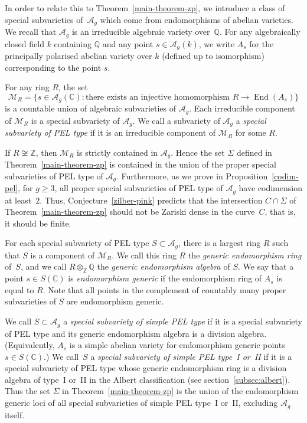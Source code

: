 \documentclass[11pt]{article}
\numberwithin{equation}{section}
\let\ra\rightarrow
\newcommand{\bC}{\mathbb{C}}
\newcommand{\bQ}{\mathbb{Q}}
\newcommand{\bZ}{\mathbb{Z}}
\newcommand{\cA}{\mathcal{A}}
\newcommand{\cM}{\mathcal{M}}
\newcommand{\Ag}{\mathcal{A}_g}
\DeclareMathOperator{\End}{End}
\newcommand{\defterm}[1]{\emph{#1}}
\begin{document}
In order to relate this to Theorem~\ref{main-theorem-zp}, we introduce a class of special subvarieties of~$\Ag$ which come from endomorphisms of abelian varieties.
We recall that $\cA_g$ is an irreducible algebraic variety over~$\bQ$.
For any algebraically closed field $k$ containing $\bQ$ and any point $s \in \Ag(k)$, we write $A_s$ for the principally polarised abelian variety over $k$ (defined up to isomorphism) corresponding to the point $s$.

For any ring $R$, the set
\[
\cM_R = \{ s \in \Ag(\bC) : \text{there exists an injective homomorphism } R \ra \End(A_s) \}
\]
is a countable union of algebraic subvarieties of $\Ag$.
Each irreducible component of $\cM_R$ is a special subvariety of $\Ag$.
We call a subvariety of $\Ag$ a \defterm{special subvariety of PEL type} if it is an irreducible component of $\cM_R$ for some $R$.

If $R \not\cong \bZ$, then $\cM_R$ is strictly contained in $\Ag$.
Hence the set $\Sigma$ defined in Theorem~\ref{main-theorem-zp} is contained in the union of the proper special subvarieties of PEL type of $\Ag$.
Furthermore, as we prove in Proposition~\ref{codim-pel}, for $g \geq 3$, all proper special subvarieties of PEL type of $\Ag$ have codimension at least~$2$.
Thus, Conjecture~\ref{zilber-pink} predicts that the intersection $C \cap \Sigma$ of Theorem~\ref{main-theorem-zp} should not be Zariski dense in the curve~$C$, that is, it should be finite.

For each special subvariety of PEL type $S \subset \Ag$, there is a largest ring $R$ such that $S$ is a component of $\cM_R$.
We call this ring $R$ the \defterm{generic endomorphism ring} of~$S$, and we call $R \otimes_\bZ \bQ$ the \defterm{generic endomorphism algebra} of $S$.
We say that a point $s\in S(\bC)$ is \defterm{endomorphism generic} if the endomorphism ring of $A_s$ is equal to $R$. Note that all points in the complement of countably many proper subvarieties of $S$ are endomorphism generic.

We call $S \subset \Ag$ a \defterm{special subvariety of simple PEL type} if it is a special subvariety of PEL type and its generic endomorphism algebra is a division algebra.
(Equivalently, $A_s$ is a simple abelian variety for endomorphism generic points $s \in S(\bC)$.)
We call~$S$ a \defterm{special subvariety of simple PEL type~I or~II} if it is a special subvariety of PEL type whose generic endomorphism ring is a division algebra of type~I or~II in the Albert classification (see section~\ref{subsec:albert}).
Thus the set $\Sigma$ in Theorem~\ref{main-theorem-zp} is the union of the endomorphism generic loci of all special subvarieties of simple PEL type~I or~II, excluding $\Ag$ itself.
\end{document}
